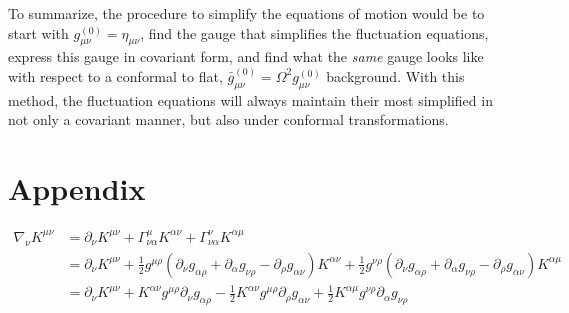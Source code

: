 \documentclass[10pt,letterpaper]{article}
\begin{document}
To summarize, the procedure to simplify the equations of motion would be to start with $g_{\mu\nu}^{(0)} = \eta_{\mu\nu}$, find the gauge that simplifies the fluctuation equations, express this gauge in covariant form, and find what the \emph{same} gauge looks like with respect to a conformal to flat, $\bar g_{\mu\nu}^{(0)} = \Omega^2 g_{\mu\nu}^{(0)}$ background. With this method, the fluctuation equations will always maintain their most simplified in not only a covariant manner, but also under conformal transformations.
\newpage
\section*{Appendix}
\begin{align}
\nabla_\nu K^{\mu\nu} &= \partial_\nu K^{\mu\nu} + \Gamma^\mu_{\nu\alpha}K^{\alpha\nu} + \Gamma^\nu_{\nu\alpha}K^{\alpha\mu}\nonumber \\
&= \partial_\nu K^{\mu\nu} + \frac12 g^{\mu\rho}(\partial_\nu g_{\alpha\rho} + \partial_\alpha g_{\nu\rho}-\partial_\rho g_{\alpha\nu})K^{\alpha\nu}
+ \frac12 g^{\nu\rho}(\partial_\nu g_{\alpha\rho}+\partial_\alpha g_{\nu\rho} - \partial_{\rho}g_{\alpha\nu})K^{\alpha\mu}\nonumber\\
&= \partial_\nu K^{\mu\nu} + K^{\alpha\nu} g^{\mu\rho} \partial_\nu g_{\alpha\rho} - \frac12 K^{\alpha\nu} g^{\mu\rho}\partial_\rho g_{\alpha\nu}
+ \frac12 K^{\alpha\mu} g^{\nu\rho}\partial_\alpha g_{\nu\rho}
\end{align}
\end{document}
